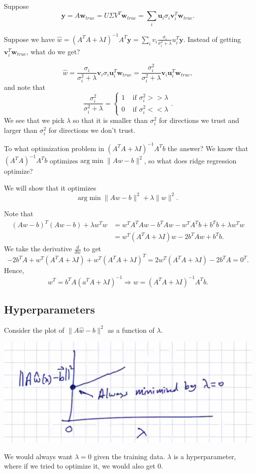 \documentclass[11pt]{article}
\newcommand{\Vu}{\mathbf{u}}
\newcommand{\Vv}{\mathbf{v}}
\newcommand{\Vw}{\mathbf{w}}
\newcommand{\Vy}{\mathbf{y}}
\begin{document}
\begin{example} Suppose $$\Vy = A \Vw_{true} = U\Sigma V^T \Vw_{true} = \sum_{i} \Vu_i \sigma_i \Vv_i^T \Vw_{true}.$$ 

Suppose we have $\hat{w} = (A^TA + \lambda I)^{-1} A^T \Vy = \sum_i v_i \frac{\sigma_i}{\sigma_i^2 + \lambda}u_i^T \Vy$.  Instead of getting $\Vv_i^T\Vw_{true}$, what do we get?

$$\hat{w} = \frac{\sigma_i}{\sigma_i^2 + \lambda} \Vv_i \sigma_i \Vu_i^T \Vw_{true} = \frac{\sigma_i^2}{\sigma_i^2 + \lambda} \Vv_i\Vu_i^T \Vw_{true},$$
and note that 
$$ \frac{\sigma_i^2}{\sigma_i^2 + \lambda} = \begin{cases}
1 & \text{ if } \sigma_i^2 >> \lambda \\ 
0 & \text{ if } \sigma_i^2 << \lambda 
\end{cases}.$$
We see that we pick $\lambda$ so that it is smaller than $\sigma_i^2$ for directions we trust and larger than $\sigma_i^2$ for directions we don't trust.
\end{example}

To what optimization problem in $(A^TA + \lambda I)^{-1} A^T b$ the answer? We know that $(A^TA)^{-1}A^Tb$ optimizes $\text{arg}\min\|Aw - b\|^2$, so what does ridge regression optimize?

We will show that it optimizes 
$$\text{arg}\min \|Aw -b \|^2 + \lambda \|w\|^2.$$

Note that 
\begin{align*}
 (Aw-b)^T(Aw-b) + \lambda w^T w &= w^TA^TAw - b^TAw - w^TA^Tb + b^Tb + \lambda w^Tw \\
 &= w^T(A^TA + \lambda I)w - 2b^TAw + b^Tb.
\end{align*}
We take the derivative $\frac{d}{dw}$ to get 
$$-2b^TA + w^T(A^TA + \lambda I) + w^T(A^TA + \lambda I)^T = 2w^T(A^TA + \lambda I) - 2b^TA = 0^T.$$
Hence,
$$w^T = b^TA(a^TA + \lambda I)^{-1} \Rightarrow w = (A^TA + \lambda I)^{-1}A^Tb.$$ 

\subsection{Hyperparameters}
Consider the plot of $\|A\hat{w} - b\|^2$ as a function of $\lambda$.
\begin{center}
\includegraphics[scale=0.75]{images/lambda.png}
\end{center}
We would always want $\lambda = 0$ given the training data.  $\lambda$ is a hyperparameter, where if we tried to optimize it, we would also get $0$.
\end{document}
